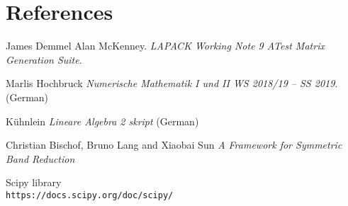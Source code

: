 \documentclass[parskip=full]{scrartcl}
\begin{document}
\section{References}
\begin{thebibliography}{9}
	James Demmel Alan McKenney. 
	\textit{LAPACK Working Note 9 ATest Matrix Generation Suite}. 
	
	Marlis Hochbruck
	\textit{Numerische Mathematik I und II WS 2018/19 – SS 2019}. (German)  
	
	Kühnlein
	\textit{Lineare Algebra 2 skript} (German)
	
	Christian Bischof, Bruno Lang and Xiaobai Sun
	\textit{A Framework for Symmetric Band Reduction}
	
	Scipy library
	\\\texttt{https://docs.scipy.org/doc/scipy/}


\end{thebibliography}
\end{document}
